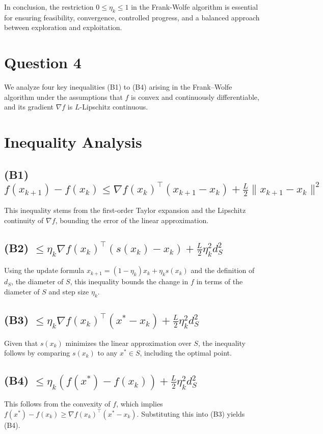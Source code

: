 \documentclass[12p]{article}
\begin{document}
In conclusion, the restriction \( 0 \leq \eta_k \leq 1 \) in the Frank-Wolfe algorithm is essential for ensuring feasibility, convergence, controlled progress, and a balanced approach between exploration and exploitation.


\section*{Question 4} 

We analyze four key inequalities (B1) to (B4) arising in the Frank–Wolfe algorithm under the assumptions that \( f \) is convex and continuously differentiable, and its gradient \( \nabla f \) is \( L \)-Lipschitz continuous.

\section*{Inequality Analysis}

\subsection*{(B1) \( f(x_{k+1}) - f(x_k) \leq \nabla f(x_k)^\top (x_{k+1} - x_k) + \frac{L}{2} \|x_{k+1} - x_k\|^2 \)}
This inequality stems from the first-order Taylor expansion and the Lipschitz continuity of \( \nabla f \), bounding the error of the linear approximation.

\subsection*{(B2) \( \leq \eta_k \nabla f(x_k)^\top (s(x_k) - x_k) + \frac{L}{2} \eta_k^2 d_S^2 \)}
Using the update formula \( x_{k+1} = (1 - \eta_k)x_k + \eta_k s(x_k) \) and the definition of \( d_S \), the diameter of \( S \), this inequality bounds the change in \( f \) in terms of the diameter of \( S \) and step size \( \eta_k \).

\subsection*{(B3) \( \leq \eta_k \nabla f(x_k)^\top (x^* - x_k) + \frac{L}{2} \eta_k^2 d_S^2 \)}
Given that \( s(x_k) \) minimizes the linear approximation over \( S \), the inequality follows by comparing \( s(x_k) \) to any \( x^* \in S \), including the optimal point.

\subsection*{(B4) \( \leq \eta_k (f(x^*) - f(x_k)) + \frac{L}{2} \eta_k^2 d_S^2 \)}
This follows from the convexity of \( f \), which implies \( f(x^*) - f(x_k) \geq \nabla f(x_k)^\top (x^* - x_k) \). Substituting this into (B3) yields (B4).
\end{document}
